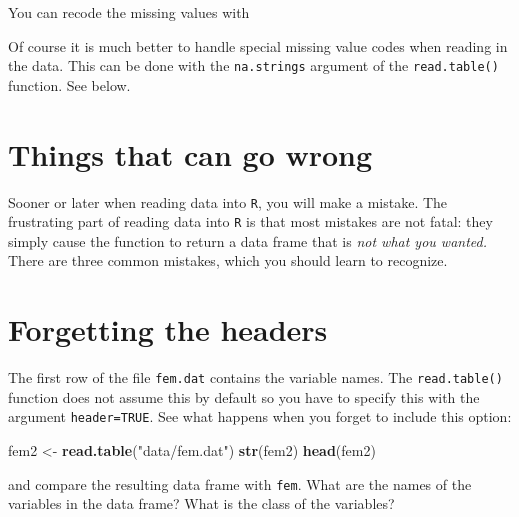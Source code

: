 \documentclass[
]{book}
\newenvironment{Shaded}{\begin{snugshade}}{\end{snugshade}}
\newcommand{\ConstantTok}[1]{\textcolor[rgb]{0.56,0.35,0.01}{#1}}
\newcommand{\DecValTok}[1]{\textcolor[rgb]{0.00,0.00,0.81}{#1}}
\newcommand{\FunctionTok}[1]{\textcolor[rgb]{0.13,0.29,0.53}{\textbf{#1}}}
\newcommand{\NormalTok}[1]{#1}
\newcommand{\OtherTok}[1]{\textcolor[rgb]{0.56,0.35,0.01}{#1}}
\newcommand{\SpecialCharTok}[1]{\textcolor[rgb]{0.81,0.36,0.00}{\textbf{#1}}}
\newcommand{\StringTok}[1]{\textcolor[rgb]{0.31,0.60,0.02}{#1}}
\begin{document}
You can recode the missing values with

\begin{Shaded}
\end{Shaded}

Of course it is much better to handle special missing value codes
when reading in the data. This can be done with the
\texttt{na.strings} argument of the \texttt{read.table()}
function. See below.

\section{Things that can go wrong}\label{things-that-can-go-wrong}

Sooner or later when reading data into \texttt{R}, you will make a
mistake. The frustrating part of reading data into \texttt{R} is that
most mistakes are not fatal: they simply cause the function to return
a data frame that is \emph{not what you wanted.} There are three
common mistakes, which you should learn to recognize.

\section{Forgetting the headers}\label{forgetting-the-headers}

The first row of the file \texttt{fem.dat} contains the variable names.
The \texttt{read.table()} function does not assume this by default so
you have to specify this with the argument \texttt{header=TRUE}. See
what happens when you forget to include this option:

\begin{Shaded}
\begin{Highlighting}[]
\NormalTok{fem2 }\OtherTok{\textless{}{-}} \FunctionTok{read.table}\NormalTok{(}\StringTok{"data/fem.dat"}\NormalTok{)}
\FunctionTok{str}\NormalTok{(fem2)}
\FunctionTok{head}\NormalTok{(fem2)}
\end{Highlighting}
\end{Shaded}

and compare the resulting data frame with \texttt{fem}. What are
the names of the variables in the data frame? What is the class
of the variables?
\end{document}
